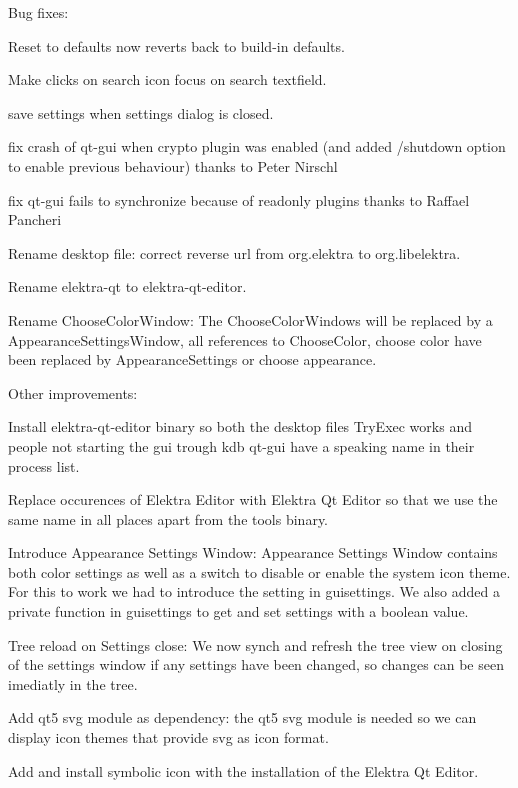 Bug fixes\+:


\begin{DoxyItemize}
\item Reset to defaults now reverts back to build-\/in defaults.
\item Make clicks on search icon focus on search textfield.
\item save settings when settings dialog is closed.
\item fix crash of qt-\/gui when crypto plugin was enabled (and added /shutdown option to enable previous behaviour) thanks to Peter Nirschl
\item fix qt-\/gui fails to synchronize because of readonly plugins thanks to Raffael Pancheri
\item Rename desktop file\+: correct reverse url from org.\+elektra to org.\+libelektra.
\item Rename elektra-\/qt to elektra-\/qt-\/editor.
\item Rename Choose\+Color\+Window\+: The Choose\+Color\+Windows will be replaced by a Appearance\+Settings\+Window, all references to Choose\+Color, choose color have been replaced by Appearance\+Settings or choose appearance.
\end{DoxyItemize}

Other improvements\+:


\begin{DoxyItemize}
\item Install {\ttfamily elektra-\/qt-\/editor} binary so both the desktop files Try\+Exec works and people not starting the gui trough {\ttfamily kdb qt-\/gui} have a speaking name in their process list.
\item Replace occurences of {\ttfamily Elektra Editor} with {\ttfamily Elektra Qt Editor} so that we use the same name in all places apart from the tools binary.
\item Introduce Appearance Settings Window\+: Appearance Settings Window contains both color settings as well as a switch to disable or enable the system icon theme. For this to work we had to introduce the setting in {\ttfamily guisettings}. We also added a private function in {\ttfamily guisettings} to get and set settings with a boolean value.
\item Tree reload on Settings close\+: We now synch and refresh the tree view on closing of the settings window if any settings have been changed, so changes can be seen imediatly in the tree.
\item Add qt5 svg module as dependency\+: the qt5 svg module is needed so we can display icon themes that provide svg as icon format.
\item Add and install symbolic icon with the installation of the Elektra Qt Editor.
\end{DoxyItemize}

